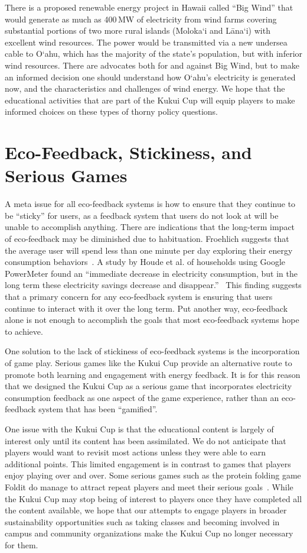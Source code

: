 \documentclass{sigchi}
\begin{document}
There is a proposed renewable energy project in Hawaii called ``Big Wind'' that would generate as much as 400\,MW of electricity from wind farms covering substantial portions of two more rural islands (Moloka`i and L\=ana`i) with excellent wind resources. The power would be transmitted via a new undersea cable to O`ahu, which has the majority of the state's population, but with inferior wind resources. There are advocates both for and against Big Wind, but to make an informed decision one should understand how O`ahu's electricity is generated now, and the characteristics and challenges of wind energy. We hope that the educational activities that are part of the Kukui Cup will equip players to make informed choices on these types of thorny policy questions.


\section{Eco-Feedback, Stickiness, and Serious Games}

A meta issue for all eco-feedback systems is how to ensure that they continue to be ``sticky'' for users, as a feedback system that users do not look at will be unable to accomplish anything. There are indications that the long-term impact of eco-feedback may be diminished due to habituation. Froehlich suggests that the average user will spend less than one minute per day exploring their energy consumption behaviors~\cite{Froehlich2010-BECC}. A study by Houde et al. of households using Google PowerMeter found an ``immediate decrease in electricity consumption, but in the long term these electricity savings decrease and disappear.''~\cite{Houde2013-powermeter} This finding suggests that a primary concern for any eco-feedback system is ensuring that users continue to interact with it over the long term. Put another way, eco-feedback alone is not enough to accomplish the goals that most eco-feedback systems hope to achieve.

One solution to the lack of stickiness of eco-feedback systems is the incorporation of game play. Serious games like the Kukui Cup provide an alternative route to promote both learning and engagement with energy feedback. It is for this reason that we designed the Kukui Cup as a serious game that incorporates electricity consumption feedback as one aspect of the game experience, rather than an eco-feedback system that has been ``gamified''. 

One issue with the Kukui Cup is that the educational content is largely of interest only until its content has been assimilated. We do not anticipate that players would want to revisit most actions unless they were able to earn additional points. This limited engagement is in contrast to games that players enjoy playing over and over. Some serious games such as the protein folding game Foldit do manage to attract repeat players and meet their serious goals~\cite{Khatib2011}. While the Kukui Cup may stop being of interest to players once they have completed all the content available, we hope that our attempts to engage players in broader sustainability opportunities such as taking classes and becoming involved in campus and community organizations make the Kukui Cup no longer necessary for them.
\end{document}
